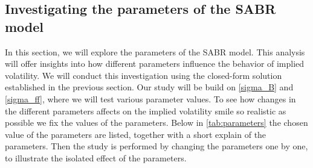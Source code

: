 \subsection{Investigating the parameters of the SABR model}
In this section, we will explore the parameters of the SABR model. This analysis will offer insights into 
how different parameters influence the behavior of implied volatility. We will conduct this investigation using 
the closed-form solution established in the previous section. Our study will be build on  \autoref{sigma_B} and 
\autoref{sigma_ff}, where we will test various parameter values. To see how changes in the different parameters
affects on the implied volatility smile so realistic as possible we fix the values of the parameters.
Below in \autoref{tab:parameters} the chosen value of the parameters are listed, together with a short
explain of the parameters. Then the study is performed by changing the parameters one by one, to illustrate the 
isolated effect of the parameters. 

